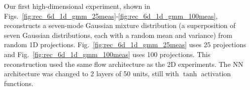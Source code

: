 \documentclass[%
    reprint,
    twocolumn,
    nofootinbib,
    amsmath,
    amssymb,
    aps,
    prstab,
]{revtex4-2}
\begin{document}
Our first high-dimensional experiment, shown in Figs.~\ref{fig:rec_6d_1d_gmm_25meas}-\ref{fig:rec_6d_1d_gmm_100meas}, reconstructs a seven-mode Gaussian mixture distribution (a superposition of seven Gaussian distributions, each with a random mean and variance) from random 1D projections. Fig.~\ref{fig:rec_6d_1d_gmm_25meas} uses 25 projections and Fig.~\ref{fig:rec_6d_1d_gmm_100meas} uses 100 projections. This reconstruction used the same flow architecture as the 2D experiments. The NN architecture was changed to 2 layers of 50 units, still with $\tanh$ activation functions.
%
\begin{figure}
    \centering
    \hfill
    \vfill
\end{figure}
\end{document}
